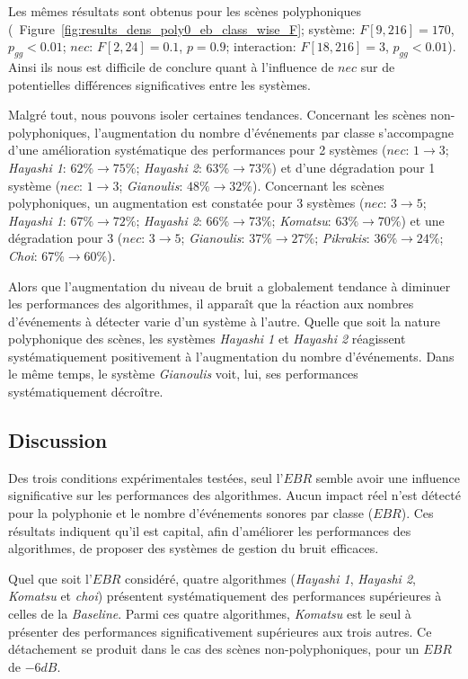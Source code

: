Les mêmes résultats sont obtenus pour les scènes polyphoniques (\cf~Figure~\ref{fig:results_dens_poly0_eb_class_wise_F}; système: $F[9,216]=170$, $p_{gg}<0.01$; $nec$: $F[2,24]=0.1$, $p=0.9$; interaction: $F[18,216]=3$, $p_{gg}<0.01$). Ainsi ils nous est difficile de conclure quant à l'influence de $nec$ sur de potentielles différences significatives entre les systèmes.

Malgré tout, nous pouvons isoler certaines tendances. Concernant les scènes non-polyphoniques, l'augmentation du nombre d'événements par classe s'accompagne d'une amélioration systématique des performances pour 2 systèmes ($nec$: $1\rightarrow 3$; \emph{Hayashi 1}: $62\%\rightarrow 75\%$; \emph{Hayashi 2}: $63\%\rightarrow 73\%$) et d'une dégradation pour 1 système ($nec$: $1\rightarrow 3$; \emph{Gianoulis}: $48\%\rightarrow 32\%$). Concernant les scènes polyphoniques, un augmentation est constatée pour 3 systèmes ($nec$: $3\rightarrow 5$; \emph{Hayashi 1}: $67\%\rightarrow 72\%$; \emph{Hayashi 2}: $66\%\rightarrow 73\%$; \emph{Komatsu}: $63\%\rightarrow 70\%$) et une dégradation pour 3 ($nec$: $3\rightarrow 5$; \emph{Gianoulis}: $37\%\rightarrow 27\%$; \emph{Pikrakis}: $36\%\rightarrow 24\%$; \emph{Choi}: $67\%\rightarrow 60\%$).

Alors que l'augmentation du niveau de bruit a globalement tendance à diminuer les performances des algorithmes, il apparaît que la réaction aux nombres d'événements à détecter varie d'un système à l'autre. Quelle que soit la nature polyphonique des scènes, les systèmes \emph{Hayashi 1} et \emph{Hayashi 2} réagissent systématiquement positivement à l'augmentation du nombre d'événements. Dans le même temps, le système \emph{Gianoulis} voit, lui, ses performances systématiquement décroître.

\subsection{Discussion}

Des trois conditions expérimentales testées, seul l'$EBR$ semble avoir une influence significative sur les performances des algorithmes. Aucun impact réel n'est détecté pour la polyphonie et le nombre d'événements sonores par classe ($EBR$). Ces résultats indiquent qu'il est capital, afin d'améliorer les performances des algorithmes, de proposer des systèmes de gestion du bruit efficaces.

Quel que soit l'$EBR$ considéré, quatre algorithmes (\emph{Hayashi 1}, \emph{Hayashi 2}, \emph{Komatsu} et \emph{choi}) présentent systématiquement des performances supérieures à celles de la \emph{Baseline}. Parmi ces quatre algorithmes, \emph{Komatsu} est le seul à présenter des performances significativement supérieures aux trois autres. Ce détachement se produit dans le cas des scènes non-polyphoniques, pour un $EBR$ de $-6dB$.

